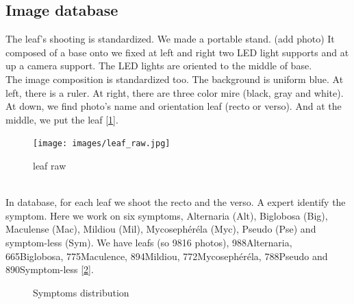 \documentclass[english]{article}
\def \nbAlt {988}
\def \nbBig {665}
\def \nbMac {775}
\def \nbMil {894}
\def \nbMyc {772}
\def \nbPse {788}
\def \nbSym {890}
\begin{document}
\subsection{Image database}
	The leaf’s shooting is standardized. We made a portable stand. (add photo) It composed of  a base  onto we fixed at left and right two LED light supports and at up a camera support. The LED lights are oriented to the middle of base.
	\\
	The image composition is standardized too. The background is uniform blue. At left, there is a ruler. At right, there are three color mire (black, gray and white). At down, we find photo’s name and orientation leaf (recto or verso). And at the middle, we put the leaf [\ref{fig:leaf_raw}].
	\begin{figure}[!htbp]
		\texttt{[image: images/leaf\_raw.jpg]}
		\caption{leaf raw}
		\label{fig:leaf_raw}
	\end{figure}
	\\
	In database, for each leaf we shoot the recto and the verso. A expert identify the symptom. Here we work on six symptoms, Alternaria (Alt), Biglobosa (Big), Maculense (Mac), Mildiou (Mil), Mycosephéréla (Myc), Pseudo (Pse) and symptom-less (Sym). We have \ttImgR leafs (so 9816 photos), \nbAlt Alternaria, \nbBig Biglobosa, \nbMac Maculence, \nbMil Mildiou, \nbMyc Mycosephéréla, \nbPse Pseudo and \nbSym Symptom-less [\ref{fig:Sym_dist}].

	\begin{figure}[!htbp]
		\caption{Symptoms distribution}
		\label{fig:Sym_dist}
	\end{figure}
\end{document}
